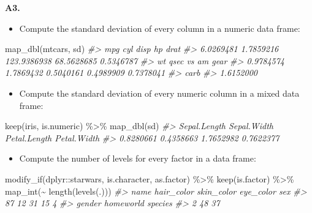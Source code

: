 \documentclass[
]{book}
\newenvironment{Shaded}{\begin{snugshade}}{\end{snugshade}}
\newcommand{\CommentTok}[1]{\textcolor[rgb]{0.56,0.35,0.01}{\textit{#1}}}
\newcommand{\FunctionTok}[1]{\textcolor[rgb]{0.00,0.00,0.00}{#1}}
\newcommand{\NormalTok}[1]{#1}
\newcommand{\SpecialCharTok}[1]{\textcolor[rgb]{0.00,0.00,0.00}{#1}}
\providecommand{\tightlist}{%
  \setlength{\itemsep}{0pt}\setlength{\parskip}{0pt}}
\begin{document}
\textbf{A3.}

\begin{itemize}
\tightlist
\item
  Compute the standard deviation of every column in a numeric data frame:
\end{itemize}

\begin{Shaded}
\begin{Highlighting}[]
\FunctionTok{map\_dbl}\NormalTok{(mtcars, sd)}
\CommentTok{\#\textgreater{}         mpg         cyl        disp          hp        drat }
\CommentTok{\#\textgreater{}   6.0269481   1.7859216 123.9386938  68.5628685   0.5346787 }
\CommentTok{\#\textgreater{}          wt        qsec          vs          am        gear }
\CommentTok{\#\textgreater{}   0.9784574   1.7869432   0.5040161   0.4989909   0.7378041 }
\CommentTok{\#\textgreater{}        carb }
\CommentTok{\#\textgreater{}   1.6152000}
\end{Highlighting}
\end{Shaded}

\begin{itemize}
\tightlist
\item
  Compute the standard deviation of every numeric column in a mixed data frame:
\end{itemize}

\begin{Shaded}
\begin{Highlighting}[]
\FunctionTok{keep}\NormalTok{(iris, is.numeric) }\SpecialCharTok{\%\textgreater{}\%}
  \FunctionTok{map\_dbl}\NormalTok{(sd)}
\CommentTok{\#\textgreater{} Sepal.Length  Sepal.Width Petal.Length  Petal.Width }
\CommentTok{\#\textgreater{}    0.8280661    0.4358663    1.7652982    0.7622377}
\end{Highlighting}
\end{Shaded}

\begin{itemize}
\tightlist
\item
  Compute the number of levels for every factor in a data frame:
\end{itemize}

\begin{Shaded}
\begin{Highlighting}[]
\FunctionTok{modify\_if}\NormalTok{(dplyr}\SpecialCharTok{::}\NormalTok{starwars, is.character, as.factor) }\SpecialCharTok{\%\textgreater{}\%}
  \FunctionTok{keep}\NormalTok{(is.factor) }\SpecialCharTok{\%\textgreater{}\%}
  \FunctionTok{map\_int}\NormalTok{(}\SpecialCharTok{\textasciitilde{}} \FunctionTok{length}\NormalTok{(}\FunctionTok{levels}\NormalTok{(.)))}
\CommentTok{\#\textgreater{}       name hair\_color skin\_color  eye\_color        sex }
\CommentTok{\#\textgreater{}         87         12         31         15          4 }
\CommentTok{\#\textgreater{}     gender  homeworld    species }
\CommentTok{\#\textgreater{}          2         48         37}
\end{Highlighting}
\end{Shaded}
\end{document}
